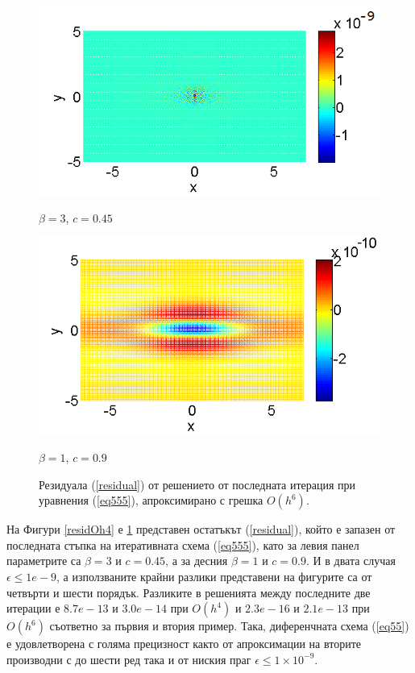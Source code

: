 \documentclass{article}
\newcommand{\rf}[1]{(\ref{#1})}
\begin{document}
\begin{figure}[htbp]
	\begin{minipage}[b]{0.45\linewidth}
		\raggedleft
		\includegraphics[width=\linewidth]{residual/residual_bt3c045_Oh6.png}
		\centerline{$\beta = 3$, $c = 0.45$}	
	\end{minipage}	
	\begin{minipage}[b]{0.41625\linewidth}
	
		 \includegraphics[width=\linewidth]{residual/residual_bt1c090_Oh6.png}
\centerline{$\beta = 1$, $c = 0.9$ }
	\end{minipage}
		\caption{Резидуала \rf{residual} от решението от последната итерация при уравнения \rf{eq555}, апроксимирано с грешка  $O(h^6)$. }
		\label{residOh6}
\end{figure}
\FloatBarrier
На Фигури \ref{residOh4} е \ref{residOh6} представен остатъкът \rf{residual}, който е запазен от последната стъпка на итеративната схема \rf{eq555}, като за левия панел  параметрите са $\beta = 3$ и $c = 0.45$, а за десния $\beta = 1$ и $c = 0.9$. И в двата случая $\epsilon \le 1e-9$, а използваните крайни разлики представени на фигурите са от четвърти и шести порядък. Разликите в решенията между последните две итерации е $8.7e-13$ и $3.0e-14$ при $O(h^4)$ и $2.3e-16$ и $2.1e-13$ при $O(h^6)$ съответно за първия и втория пример. Така, диференчната схема \rf{eq55} е удовлетворена с голяма прецизност както от апроксимации на вторите производни с до шести ред така и от ниския праг $\epsilon \le 1\times10^{-9}$. 
\end{document}

